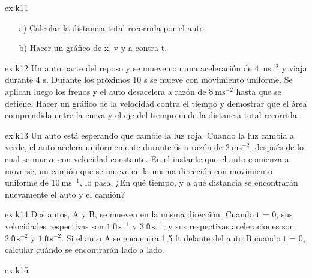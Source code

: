 \begin{multicols}{2}
\begin{excercise}[][][a) $x=9.25\ \mathrm{m}$]{ex:k11}
{\begin{itemize}
                \item[a)] Calcular la distancia total recorrida por el auto.              
                \item[b)] Hacer un gráfico de x, v y a contra t.
            \end{itemize}
         }
    \end{excercise}
    \begin{excercise}[][][ $x=209\ \mathrm{m}$]{ex:k12}{
            Un auto parte del reposo y se mueve con una aceleración de $4\ \mathrm{ms^{-2}}$ y viaja durante 4 s. Durante los próximos 10 s se mueve con movimiento uniforme. Se aplican luego los frenos y el auto desacelera a razón de $8\ \mathrm{ms^{-2}}$ hasta que se detiene. Hacer un gráfico de la velocidad contra el tiempo y demostrar que el área comprendida entre la curva y el eje del tiempo mide la distancia total recorrida. 
         }
    \end{excercise}
    \begin{excercise}[][][$d=180\ \mathrm{m}$,  $t=18\ \mathrm{s}$]{ex:k13}{
         Un auto está esperando que cambie la luz roja. Cuando la luz cambia a verde, el auto acelera uniformemente durante 6s a razón de $2 \ \mathrm{ms^{-2}}$, después de lo cual se mueve con velocidad constante. En el instante que el auto comienza a moverse, un camión que se mueve en la misma dirección con movimiento uniforme de $10 \ \mathrm{ms^{-1}}$, lo pasa. ¿En qué tiempo, y a qué distancia se encontrarán nuevamente el auto y el camión? 
         }
    \end{excercise}
    \begin{excercise}[][][a) $t=103\ \mathrm{s}$]{ex:k14}{
         Dos autos, A y B, se mueven en la misma dirección. Cuando t = 0, sus velocidades respectivas son  $1 \ \mathrm{fts^{-1}}$ y  $3 \ \mathrm{fts^{-1}}$, y sus respectivas aceleraciones son  $2 \ \mathrm{fts^{-2}}$ y  $1 \ \mathrm{fts^{-2}}$. Si el auto A se encuentra 1,5 ft delante del auto B cuando t = 0, calcular cuándo se encontrarán lado a lado. 
         }
    \end{excercise}
    \begin{excercise}[][][a) $x=10\ \mathrm{m}$; b) $t=8/3\ \mathrm{s}$; c)  $v=4\ \mathrm{ms^{-1}}$; d)  $v=16-12t_0-6\Delta t$; e) $v(t)16-12t$; f)  $v=16\ \mathrm{ms^{-1}}$; g)  $t=41.33\ \mathrm{s}$,  $x=10.7\ \mathrm{m}$; h)  $a=-12\ \mathrm{ms^{-2}}$;  i)  $a(t)=-12\ \mathrm{ms^{-2}}$]{ex:k15}{
}
\end{excercise}
\end{multicols}
